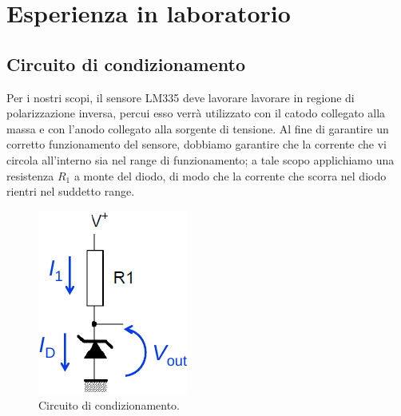 \documentclass[a4paper]{article}
\begin{document}
	\section{Esperienza in laboratorio}
		\subsection{Circuito di condizionamento}
			Per i nostri scopi, il sensore LM335 deve lavorare lavorare in regione di polarizzazione inversa, percui esso verrà utilizzato con il catodo collegato alla massa e con l'anodo collegato alla sorgente di tensione.
			\newline
			Al fine di garantire un corretto funzionamento del sensore, dobbiamo garantire che la corrente che vi circola all'interno sia nel range di funzionamento; a tale scopo applichiamo una resistenza $ R_{1} $ a monte del diodo, di modo che la corrente che scorra nel diodo rientri nel suddetto range.
			\begin{figure}[h!]
				\centering
				\includegraphics[scale=0.5]{circuitoDiCondizionamento}
				\caption{Circuito di condizionamento.}
				\label{fig:circuitoDiCondizionamento}
			\end{figure}
\end{document}
